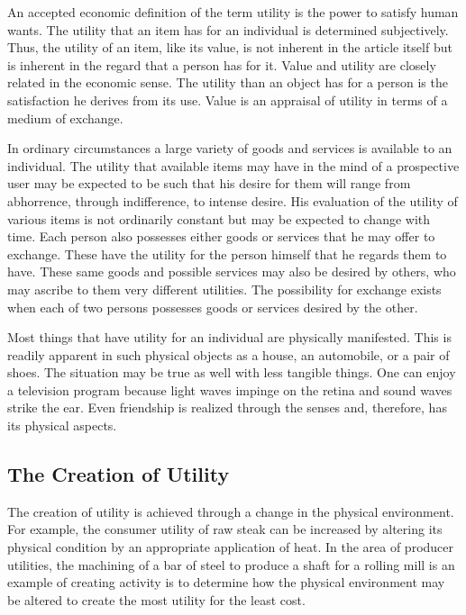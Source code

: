 An accepted economic definition of the term utility is the power to satisfy human wants. The utility that an item has for an individual is determined subjectively. Thus, the utility of an item, like its value, is not inherent in the article itself but is inherent in the regard that a person has for it. Value and utility are closely related in the economic sense. The utility than an object has for a person is the satisfaction he derives from its use. Value is an appraisal of utility in terms of a medium of exchange.

In ordinary circumstances a large variety of goods and services is available to an individual. The utility that available items may have in the mind of a prospective user may be expected to be such that his desire for them will range from abhorrence, through indifference, to intense desire. His evaluation of the utility of various items is not ordinarily constant but may be expected to change with time. Each person also possesses either goods or services that he may offer to exchange. These have the utility for the person himself that he regards them to have. These same goods and possible services may also be desired by others, who may ascribe to them very different utilities. The possibility for exchange exists when each of two persons possesses goods or services desired by the other.

Most things that have utility for an individual are physically manifested. This is readily apparent in such physical objects as a house, an automobile, or a pair of shoes. The situation may be true as well with less tangible things. One can enjoy a television program because light waves impinge on the retina and sound waves strike the ear. Even friendship is realized through the senses and, therefore, has its physical aspects.
    
\subsection{The Creation of Utility}

The creation of utility is achieved through a change in the physical environment. For example, the consumer utility of raw steak can be increased by altering its physical condition by an appropriate application of heat. In the area of producer utilities, the machining of a bar of steel to produce a shaft for a rolling mill is an example of creating activity is to determine how the physical environment may be altered to create the most utility for the least cost.

